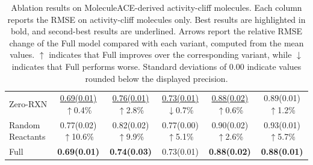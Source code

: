 \begin{table}[t]
\begin{tabular}{lccccc}
Zero-RXN & \shortstack{\underline{0.69(0.01)}\\$\uparrow$0.4\%} & \shortstack{\underline{0.76(0.01)}\\$\uparrow$2.8\%} & \shortstack{\underline{0.73(0.01)}\\$\downarrow$0.7\%} & \shortstack{\underline{0.88(0.02)}\\$\uparrow$0.6\%} & \shortstack{0.89(0.01)\\$\uparrow$1.2\%} \\

Random Reactants & \shortstack{0.77(0.02)\\$\uparrow$10.6\%} & \shortstack{0.82(0.02)\\$\uparrow$9.9\%} & \shortstack{0.77(0.00)\\$\uparrow$5.1\%} & \shortstack{0.90(0.02)\\$\uparrow$2.6\%} & \shortstack{0.93(0.01)\\$\uparrow$5.7\%} \\

Full & \textbf{0.69(0.01)} & \textbf{0.74(0.03)} & 0.73(0.01) & \textbf{0.88(0.02)} & \textbf{0.88(0.01)} \\
\hline
\end{tabular}
\caption{Ablation results on MoleculeACE-derived activity-cliff molecules. Each column reports the RMSE on activity-cliff molecules only. Best results are highlighted in bold, and second-best results are underlined. Arrows report the relative RMSE change of the Full model compared with each variant, computed from the mean values. $\uparrow$ indicates that Full improves over the corresponding variant, while $\downarrow$ indicates that Full performs worse. Standard deviations of \(0.00\) indicate values rounded below the displayed precision.}
\label{tab:clif_ablation}
\end{table}
